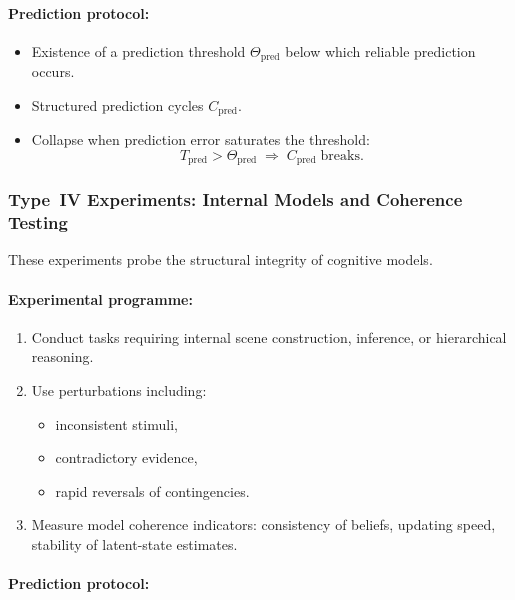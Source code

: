 \paragraph{Prediction protocol:}

\begin{itemize}
    \item Existence of a prediction threshold
          $\Theta_{\mathrm{pred}}$ below which reliable prediction occurs.
    \item Structured prediction cycles $C_{\mathrm{pred}}$.
    \item Collapse when prediction error saturates the threshold:
          \[
             T_{\mathrm{pred}} > \Theta_{\mathrm{pred}}
             \;\Rightarrow\; C_{\mathrm{pred}} \;\text{breaks}.
          \]
\end{itemize}



\subsubsection{Type~IV Experiments: Internal Models and Coherence Testing}

These experiments probe the structural integrity of
cognitive models.

\paragraph{Experimental programme:}

\begin{enumerate}
    \item Conduct tasks requiring internal scene construction,
          inference, or hierarchical reasoning.
    \item Use perturbations including:
          \begin{itemize}
              \item inconsistent stimuli,
              \item contradictory evidence,
              \item rapid reversals of contingencies.
          \end{itemize}
    \item Measure model coherence indicators:
          consistency of beliefs, updating speed, stability of
          latent-state estimates.
\end{enumerate}

\paragraph{Prediction protocol:}

